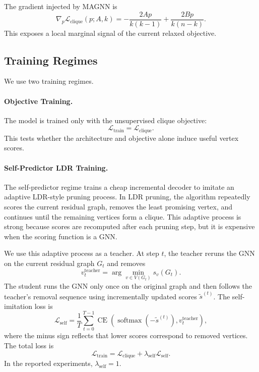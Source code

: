 The gradient injected by MAGNN is
\[
  \nabla_p \mathcal{L}_{\mathrm{clique}}(p;A,k)
  =
  -\frac{2Ap}{k(k-1)}
  +\frac{2Bp}{k(n-k)} .
\]
This exposes a local marginal signal of the current relaxed objective.

\subsection{Training Regimes}

We use two training regimes.

\paragraph{Objective Training.}
The model is trained only with the unsupervised clique objective:
\[
  \mathcal{L}_{\mathrm{train}}
  =
  \mathcal{L}_{\mathrm{clique}} .
\]
This tests whether the architecture and objective alone induce useful vertex scores.

\paragraph{Self-Predictor LDR Training.}
The self-predictor regime trains a cheap incremental decoder to imitate an adaptive LDR-style pruning process. In LDR pruning, the algorithm repeatedly scores the current residual graph, removes the least promising vertex, and continues until the remaining vertices form a clique. This adaptive process is strong because scores are recomputed after each pruning step, but it is expensive when the scoring function is a GNN.

We use this adaptive process as a teacher. At step $t$, the teacher reruns the GNN on the current residual graph $G_t$ and removes
\[
  v_t^{\mathrm{teacher}}
  =
  \arg\min_{v\in V(G_t)} s_v(G_t).
\]
The student runs the GNN only once on the original graph and then follows the teacher's removal sequence using incrementally updated scores $\tilde{s}^{(t)}$. The self-imitation loss is
\[
  \mathcal{L}_{\mathrm{self}}
  =
  \frac{1}{T}\sum_{t=0}^{T-1}
  \operatorname{CE}\!\left(
    \operatorname{softmax}(-\tilde{s}^{(t)}),
    v_t^{\mathrm{teacher}}
  \right),
\]
where the minus sign reflects that lower scores correspond to removed vertices. The total loss is
\[
  \mathcal{L}_{\mathrm{train}}
  =
  \mathcal{L}_{\mathrm{clique}}
  +
  \lambda_{\mathrm{self}}\mathcal{L}_{\mathrm{self}} .
\]
In the reported experiments, $\lambda_{\mathrm{self}}=1$.

